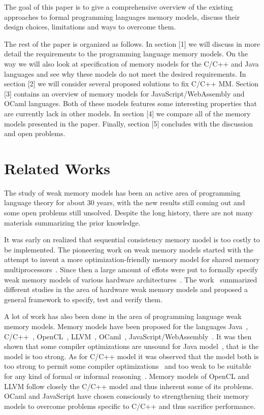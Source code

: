\documentclass[a4paper,twoside,11pt]{article}
\numberwithin{equation}{section}
\begin{document}
The goal of this paper is to give a comprehensive overview of 
the existing approaches to formal programming languages memory models,
discuss their design choices, limitations and ways to overcome them.   

The rest of the paper is organized as follows.
In section [1] we will discuss in more detail the requirements to the programming language memory models.
On the way we will also look at specification of memory models for the C/C++ and Java languages
and see why these models do not meet the desired requirements.
In section [2] we will consider several proposed solutions to fix C/C++ MM. 
Section [3] contains an overview of memory models for JavaScript/WebAssembly and OCaml languages. 
Both of these models features some interesting properties that are currently lack in other models.
In section [4] we compare all of the memory models presented in the paper.
Finally, section [5] concludes with the discussion and open problems. 

\section{Related Works}

The study of weak memory models has been an active 
area of programming language theory for about 30 years,
with the new results still coming out and some open problems still unsolved.
Despite the long history, there are not many materials summarizing the prior knowledge.

It was early on realized that sequential consistency memory model is too costly to be implemented. 
The pioneering work on weak memory models started with the attempt to 
invent a more optimization-friendly memory model 
for shared memory multiprocessors~\cite{Adve:PhD93, Adve:Comp96}.
Since then a large amount of effots were put to formally specify weak memory models of various 
hardware architectures~\cite{Chong-ASPLOS08, Alglave-DAMP09, Sewell-al:CACM10, Sarkar-al:PLDI11, Flur-al:POPL16}.
The work~\cite{Alglave-al:TOPLAS14} summarized different studies in the area 
of hardware weak memory models and proposed a general 
framework to specify, test and verify them.

A lot of work has also been done in the area of programming language weak memory models.
Memory models have been proposed for the languages
Java~\cite{Manson-al:POPL05}, C/C++~\cite{Boehm-Adve:PLDI08, Batty-al:POPL11}, 
OpenCL~\cite{Batty-el:POPL16}, LLVM~\cite{Chakraborty-Vafeiadis:CGO17}, 
OCaml~\cite{Dolan-al:PLDI18}, JavaScript/WebAssembly~\cite{Watt-el:PLDI2020}.
It was then shown that some compiler optimizations are unsound 
for Java model~\cite{Sevcik-Aspinall:ECOOP08}, that is the model is too strong.
As for C/C++ model it was observed that the model both is too strong 
to permit some compiler optimizations~\cite{Vafeiadis-al:POPL15} and too weak to 
be suitable for any kind of formal or informal reasoning~\cite{Boehm-Demsky:MSPC14}. 
Memory models of OpenCL and LLVM follow closely the C/C++ model
and thus inherent some of its problems.
OCaml and JavaScript have chosen consciously to strengthening their memory models
to overcome problems specific to C/C++ and thus sacrifice performance. 
\end{document}
